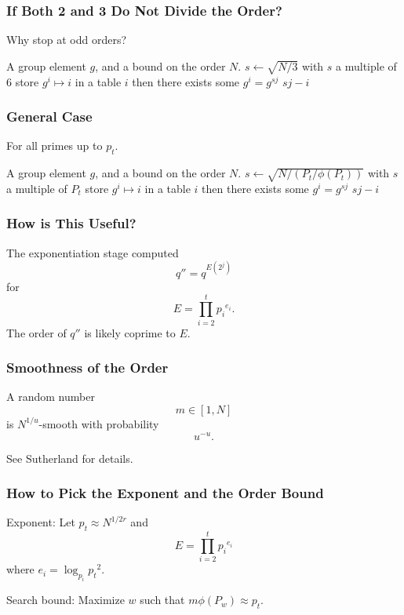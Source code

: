 \documentclass{beamer}
\newcommand{\smallfont}{\fontsize{6pt}{7.2}\selectfont}
\begin{document}
\begin{frame}
\frametitle{If Both 2 and 3 Do Not Divide the Order?}
Why stop at odd orders?

\bigbreak
\begin{algorithmic}[1]
\Require A group element $g$, and a bound on the order $N$.
\State $s \gets \sqrt{N/3}$ with $s$ a multiple of 6
	\State store $g^i \mapsto i$ in a table
	 \Return $i$ \EndIf
\EndFor
{}
		\State then there exists some $g^i = g^{sj}$
		\State \Return $sj - i$
	\EndIf
\EndFor
\end{algorithmic}
\end{frame}

\begin{frame}
\frametitle{General Case}
For all primes up to $p_t$.

\bigbreak
\begin{algorithmic}[1]
\Require A group element $g$, and a bound on the order $N$.
\State $s \gets \sqrt{N/(P_t/\phi(P_t))}$ with $s$ a multiple of $P_t$
	\State store $g^i \mapsto i$ in a table
	 \Return $i$ \EndIf
\EndFor
{}
		\State then there exists some $g^i = g^{sj}$
		\State \Return $sj - i$
	\EndIf
\EndFor
\end{algorithmic}
\end{frame}

\begin{frame}
\frametitle{How is This Useful?}

The exponentiation stage computed
\[
	q'' = q^{E\left(2^j\right)}
\]
for
\[
	E = \prod_{i=2}^t {p_i}^{e_i}.
\]
The order of $q''$ is likely coprime to $E$.
\end{frame}

\begin{frame}
\frametitle{Smoothness of the Order}
A random number 
\[
m \in [1, N]
\]
is $N^{1/u}$-smooth with probability
\[
u^{-u}.
\]

\bigbreak\bigbreak\bigbreak
\smallfont
See Sutherland for details.
\end{frame}

\begin{frame}
\frametitle{How to Pick the Exponent and the Order Bound}
Exponent: Let $p_t \approx N^{1/2r}$ and
\[
	E = \prod_{i=2}^t {p_i}^{e_i}
\]
where $e_i = \log_{p_i} {p_t}^2$.

\bigbreak
Search bound: Maximize $w$ such that $m\phi(P_w) \approx p_t$.
\end{frame}
\end{document}
